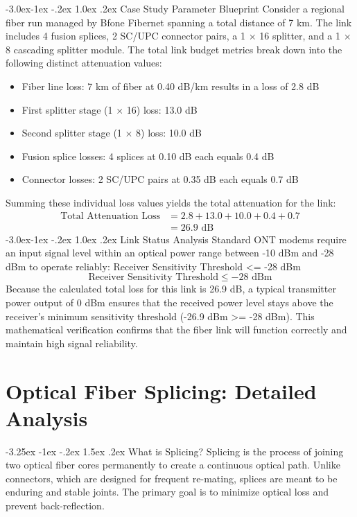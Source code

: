 \documentclass[11pt,a4paper]{report}
\makeatletter
\renewcommand{\section}{\@startsection{section}{1}{\z@}%
  {-3.25ex \@plus -1ex \@minus -.2ex}%
  {1.5ex \@plus.2ex}%
  {\normalfont\Large\bfseries\color{primaryColor}}}
\renewcommand{\subsection}{\@startsection{subsection}{2}{\z@}%
  {-3.0ex\@plus -1ex \@minus -.2ex}%
  {1.0ex \@plus .2ex}%
  {\normalfont\large\bfseries\color{secondaryColor}}}
\makeatother
\begin{document}
\subsection{Case Study Parameter Blueprint}
Consider a regional fiber run managed by Bfone Fibernet spanning a total distance of 7 km. The link includes 4 fusion splices, 2 SC/UPC connector pairs, a 1 $\times$ 16 splitter, and a 1 $\times$ 8 cascading splitter module. The total link budget metrics break down into the following distinct attenuation values:
\begin{itemize}
  \item Fiber line loss: 7 km of fiber at 0.40 dB/km results in a loss of 2.8 dB
  \item First splitter stage (1 $\times$ 16) loss: 13.0 dB
  \item Second splitter stage (1 $\times$ 8) loss: 10.0 dB
  \item Fusion splice losses: 4 splices at 0.10 dB each equals 0.4 dB
  \item Connector losses: 2 SC/UPC pairs at 0.35 dB each equals 0.7 dB
\end{itemize}
Summing these individual loss values yields the total attenuation for the link:
\begin{align*} \text{Total Attenuation Loss} &= 2.8 + 13.0 + 10.0 + 0.4 + 0.7 \\ &= 26.9\text{ dB} \end{align*}
\subsection{Link Status Analysis}
Standard ONT modems require an input signal level within an optical power range between -10 dBm and -28 dBm to operate reliably: Receiver Sensitivity Threshold <= -28 dBm
\begin{equation}\text{Receiver Sensitivity Threshold} \le -28\text{ dBm}\end{equation}
Because the calculated total loss for this link is 26.9 dB, a typical transmitter power output of 0 dBm ensures that the received power level stays above the receiver's minimum sensitivity threshold (-26.9 dBm >= -28 dBm). This mathematical verification confirms that the fiber link will function correctly and maintain high signal reliability.
\chapter{Optical Fiber Splicing: Detailed Analysis}
\section{What is Splicing?}
Splicing is the process of joining two optical fiber cores permanently to create a continuous optical path. Unlike connectors, which are designed for frequent re-mating, splices are meant to be enduring and stable joints. The primary goal is to minimize optical loss and prevent back-reflection.
\end{document}
